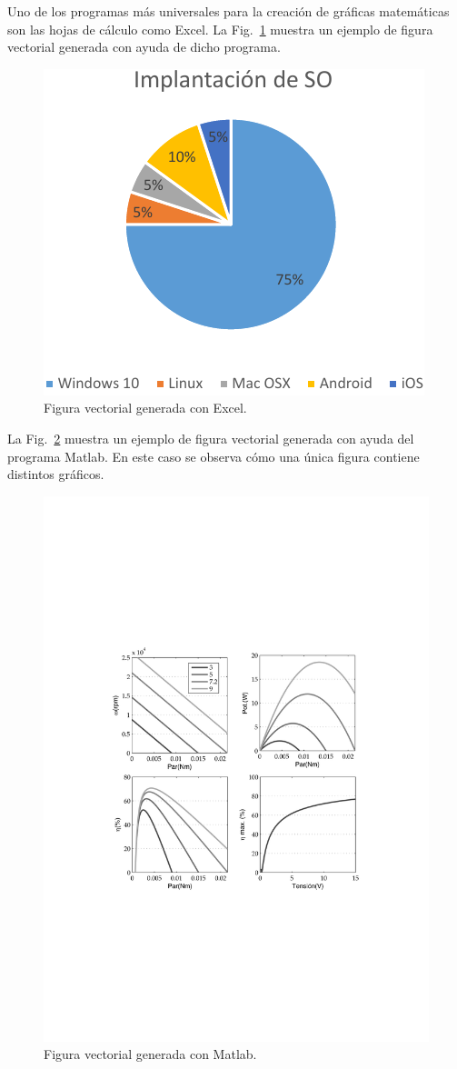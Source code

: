 \documentclass[11pt,a4paper]{article}
\begin{document}
Uno de los programas más universales para la creación de gráficas matemáticas son las hojas de cálculo como Excel. La Fig.~\ref{fig:excel} muestra un ejemplo de figura vectorial generada con ayuda de dicho programa.

\begin{figure}[H]
	\centering
	\includegraphics[width=0.5\linewidth]{EjFigsExcelOrig-crop} 
	\caption[Gráfico de Excel]{Figura vectorial generada con Excel.}
	\label{fig:excel}
\end{figure}

La Fig.~\ref{fig:matlabGrafs} muestra un ejemplo de figura vectorial generada con ayuda del programa Matlab. En este caso se observa cómo una única figura contiene distintos gráficos. %

\begin{figure}[H]
	\centering
	\includegraphics[width=0.8\linewidth]{matlabGrafs} 
	\caption[Gráfico de Matlab]{Figura vectorial generada con Matlab.}
	\label{fig:matlabGrafs}
\end{figure}
\end{document}
